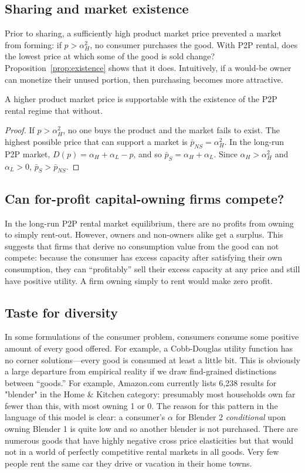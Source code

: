 \documentclass[11pt]{article}
\begin{document}
\subsection{Sharing and market existence} 
Prior to sharing, a sufficiently high product market price prevented a market from forming:
if $p > \alpha_H^2$, no consumer purchases the good. 
With P2P rental, does the lowest price at which some of the good is sold change?  
Proposition~\ref{prop:existence} shows that it does. 
Intuitively, if a would-be owner can monetize their unused portion, then purchasing becomes more attractive. 

\begin{prop} \label{prop:existence} 
A higher product market price is supportable with the existence of the P2P rental regime that without.  
\end{prop}
\begin{proof} 
If $p > \alpha_H^2$, no one buys the product and the market fails to exist.
The highest possible price that can support a market is $\bar{p}_{NS} = \alpha_H^2$.  
In the long-run P2P market, $D(p) = \alpha_H + \alpha_L - p$, and so $\bar{p}_{S} = \alpha_H + \alpha_L$. 
Since $\alpha_H > \alpha_H^2$ and $\alpha_L > 0$, $\bar{p}_S > \bar{p}_{NS}$.  
\end{proof} 

\subsection{Can for-profit capital-owning firms compete?} 
In the long-run P2P rental market equilibrium, there are no profits from owning to simply rent-out. 
However, owners and non-owners alike get a surplus. 
This suggests that firms that derive no consumption value from the good can not compete: 
because the consumer has excess capacity after satisfying their own consumption, they can ``profitably'' sell 
their excess capacity at any price and still have positive utility. 
A firm owning simply to rent would make zero profit. 

\subsection{Taste for diversity} 
In some formulations of the consumer problem, consumers consume some positive amount of every good offered.
For example, a Cobb-Douglas utility function has no corner solutions---every good is consumed at least a little bit.
This is obviously a large departure from empirical reality if we draw find-grained distinctions between ``goods.'' 
For example, Amazon.com currently lists 6,238 results for "blender" in the Home \& Kitchen category: 
presumably most households own far fewer than this, with most owning 1 or 0.
The reason for this pattern in the language of this model is clear: 
a consumer's $\alpha$ for Blender 2 \emph{conditional} upon owning Blender 1 is quite low and so another blender is not purchased.   
There are numerous goods that have highly negative cross price elasticities but that would not in a world of perfectly competitive rental markets in all goods.  
Very few people rent the same car they drive or vacation in their home towns. 
     
\end{document}
